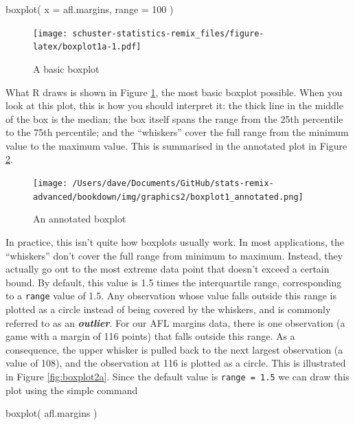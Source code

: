 \documentclass[
]{book}
\newenvironment{Shaded}{\begin{snugshade}}{\end{snugshade}}
\newcommand{\AttributeTok}[1]{\textcolor[rgb]{0.77,0.63,0.00}{#1}}
\newcommand{\DecValTok}[1]{\textcolor[rgb]{0.00,0.00,0.81}{#1}}
\newcommand{\FunctionTok}[1]{\textcolor[rgb]{0.00,0.00,0.00}{#1}}
\newcommand{\NormalTok}[1]{#1}
\begin{document}
\begin{Shaded}
\begin{Highlighting}[]
\FunctionTok{boxplot}\NormalTok{( }\AttributeTok{x =}\NormalTok{ afl.margins, }\AttributeTok{range =} \DecValTok{100}\NormalTok{ )}
\end{Highlighting}
\end{Shaded}

\begin{figure}
\centering
\texttt{[image: schuster-statistics-remix\_files/figure-latex/boxplot1a-1.pdf]}
\caption{\label{fig:boxplot1a}A basic boxplot}
\end{figure}

What R draws is shown in Figure \ref{fig:boxplot1a}, the most basic boxplot possible. When you look at this plot, this is how you should interpret it: the thick line in the middle of the box is the median; the box itself spans the range from the 25th percentile to the 75th percentile; and the ``whiskers'' cover the full range from the minimum value to the maximum value. This is summarised in the annotated plot in Figure \ref{fig:boxplot1b}.

\begin{figure}
\centering
\texttt{[image: /Users/dave/Documents/GitHub/stats-remix-advanced/bookdown/img/graphics2/boxplot1\_annotated.png]}
\caption{\label{fig:boxplot1b}An annotated boxplot}
\end{figure}

In practice, this isn't quite how boxplots usually work. In most applications, the ``whiskers'' don't cover the full range from minimum to maximum. Instead, they actually go out to the most extreme data point that doesn't exceed a certain bound. By default, this value is 1.5 times the interquartile range, corresponding to a \texttt{range} value of 1.5. Any observation whose value falls outside this range is plotted as a circle instead of being covered by the whiskers, and is commonly referred to as an \textbf{\emph{outlier}}. For our AFL margins data, there is one observation (a game with a margin of 116 points) that falls outside this range. As a consequence, the upper whisker is pulled back to the next largest observation (a value of 108), and the observation at 116 is plotted as a circle. This is illustrated in Figure \ref{fig:boxplot2a}. Since the default value is \texttt{range\ =\ 1.5} we can draw this plot using the simple command

\begin{Shaded}
\begin{Highlighting}[]
\FunctionTok{boxplot}\NormalTok{( afl.margins )}
\end{Highlighting}
\end{Shaded}
\end{document}
